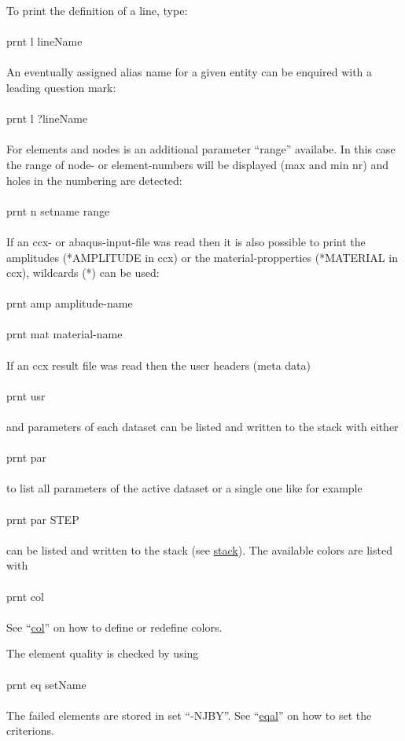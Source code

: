 \documentclass{article}
\providecommand{\htmlref}[2]{\hyperref[#2]{#1}}
\begin{document}
To print the definition of a line, type:\\\\prnt l lineName\\\\An eventually assigned alias name for a given entity can be enquired with a leading question mark:\\\\prnt l ?lineName\\\\For elements and nodes is an additional parameter ``range'' availabe. In this case the range of node- or element-numbers will be displayed (max and min nr) and holes in the numbering are detected:\\\\prnt n setname range\\\\ If an ccx- or abaqus-input-file was read then it is also possible to print the amplitudes (*AMPLITUDE in ccx) or the material-propperties (*MATERIAL in ccx), wildcards (*) can be used:\\\\prnt amp amplitude-name\\\\prnt mat material-name\\\\
If an ccx result file was read then the user headers (meta data)\\\\prnt usr\\\\and parameters of each dataset can be listed and written to the stack with either\\\\prnt par\\\\to list all parameters of the active dataset or a single one like for example \\\\prnt par STEP\\\\can be listed and written to the stack (see \htmlref{stack}{stack}). The available colors are listed with\\\\prnt col\\\\See ``\htmlref{col}{col}'' on how to define or redefine colors. 

The element quality is checked by using\\\\prnt eq setName\\\\The failed elements are stored in set ``-NJBY''. See ``\htmlref{eqal}{eqal}'' on how to set the criterions.
\end{document}

